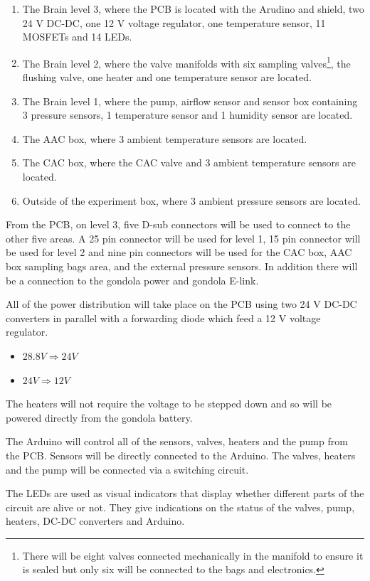 \begin{enumerate}
    \item The Brain level 3, where the PCB is located with the Arudino and shield, two 24 V DC-DC, one 12 V voltage regulator, one temperature sensor, 11 MOSFETs and 14 LEDs.
    \item The Brain level 2, where the valve manifolds with six sampling valves\footnote{There will be eight valves connected mechanically in the manifold to ensure it is sealed but only six will be connected to the bags and electronics.\label{fn:extravalve}}, the flushing valve, one heater and one temperature sensor are located.
    \item The Brain level 1, where the pump, airflow sensor and sensor box containing 3 pressure sensors, 1 temperature sensor and 1 humidity sensor are located.
    \item The AAC box, where 3 ambient temperature sensors are located.
    \item The CAC box, where the CAC valve and 3 ambient temperature sensors are located.
    \item Outside of the experiment box, where 3 ambient pressure sensors are located.
\end{enumerate}

From the PCB, on level 3, five D-sub connectors will be used to connect to the other five areas. A 25 pin connector will be used for level 1, 15 pin connector will be used for level 2 and nine pin connectors will be used for the CAC box, AAC box sampling bags area, and the external pressure sensors. In addition there will be a connection to the gondola power and gondola E-link.

All of the power distribution will take place on the PCB using two 24 V DC-DC converters in parallel with a forwarding diode which feed a 12 V voltage regulator. 
\begin{itemize}
  \item $28.8 V \Longrightarrow 24 V $  
  \item $24 V \Longrightarrow 12 V$ 
  \end{itemize}
The heaters will not require the voltage to be stepped down and so will be powered directly from the gondola battery.

The Arduino will control all of the sensors, valves, heaters and the pump from the PCB. Sensors will be directly connected to the Arduino. The valves, heaters and the pump will be connected via a switching circuit.

The LEDs are used as visual indicators that display whether different parts of the circuit are alive or not. They give indications on the status of the valves, pump, heaters, DC-DC converters and Arduino. 

